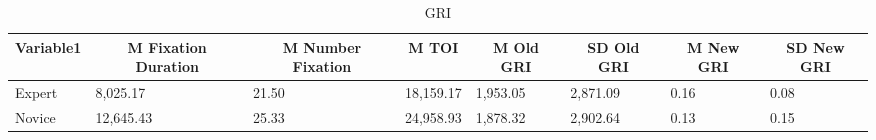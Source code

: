 \documentclass[
  english,
  man,floatsintext]{apa6}
\begin{document}
\begin{table}[h]
\begin{center}
\begin{threeparttable}
{}

\end{threeparttable}
\end{center}

\end{table}

\begin{table}[h]

\begin{center}
\begin{threeparttable}

\caption{\label{tab:GRItable3}GRI}

\tiny{

\begin{tabular}{llllllll}
\toprule
Variable1 & \multicolumn{1}{c}{M Fixation Duration} & \multicolumn{1}{c}{M Number Fixation} & \multicolumn{1}{c}{M TOI} & \multicolumn{1}{c}{M Old GRI} & \multicolumn{1}{c}{SD Old GRI} & \multicolumn{1}{c}{M New GRI} & \multicolumn{1}{c}{SD New GRI}\\
\midrule
Expert & 8,025.17 & 21.50 & 18,159.17 & 1,953.05 & 2,871.09 & 0.16 & 0.08\\
Novice & 12,645.43 & 25.33 & 24,958.93 & 1,878.32 & 2,902.64 & 0.13 & 0.15\\
\bottomrule
\end{tabular}

}

\end{threeparttable}
\end{center}

\end{table}
\end{document}
